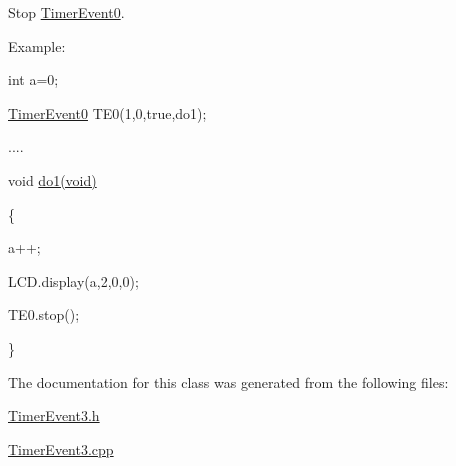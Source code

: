 \label{d3/df4/class_timer_event3_af52f04028de8e391912b41040f29b4fb}
\par
Stop \hyperlink{class_timer_event0}{TimerEvent0}.\par
 \par
Example:\par
\par
 int a=0; \par
 \hyperlink{class_timer_event0}{TimerEvent0} TE0(1,0,true,do1);\par
 .... \par
 void \hyperlink{main_8cpp_a6f6b769350d62a237ee918e52d844b28}{do1(void)}\par
 \{ \par
 a++; \par
 LCD.display(a,2,0,0);\par
 TE0.stop(); \par
 \}\par
 

The documentation for this class was generated from the following files:\begin{DoxyCompactItemize}
\item 
\hyperlink{_timer_event3_8h}{TimerEvent3.h}\item 
\hyperlink{_timer_event3_8cpp}{TimerEvent3.cpp}\end{DoxyCompactItemize}
